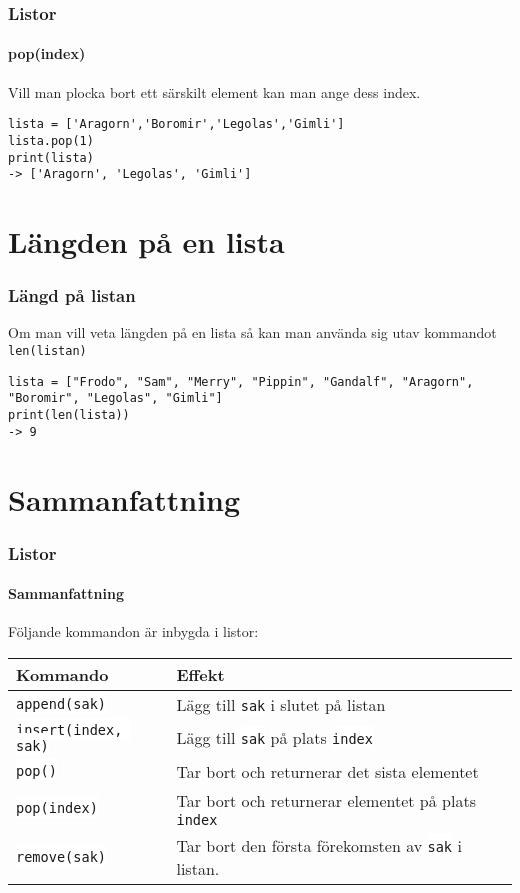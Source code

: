\documentclass[aspectratio=169]{beamer}
\newcommand{\code}[1]{\colorbox{white}{\lstinline{#1}}}
\begin{document}
\begin{frame}[fragile]
\frametitle{Listor}
\framesubtitle{pop(index)}

Vill man plocka bort ett särskilt element kan man ange dess index.

\begin{lstlisting}
lista = ['Aragorn','Boromir','Legolas','Gimli']
lista.pop(1)
print(lista)
-> ['Aragorn', 'Legolas', 'Gimli']
\end{lstlisting}
\end{frame}

\section{Längden på en lista}

\begin{frame}[fragile]
\frametitle{Längd på listan}

Om man vill veta längden på en lista så kan man använda sig utav kommandot \code{len(listan)}

\begin{lstlisting}
lista = ["Frodo", "Sam", "Merry", "Pippin", "Gandalf", "Aragorn", "Boromir", "Legolas", "Gimli"]
print(len(lista))
-> 9
\end{lstlisting}

\end{frame}

\section{Sammanfattning}

\begin{frame}[fragile]
\frametitle{Listor}
\framesubtitle{Sammanfattning}

Följande kommandon är inbygda i listor:

\begin{center}
\begin{tabular}{|lp{6cm}|}
\hline
	\textbf{Kommando} & \textbf{Effekt} \\ \hline
	\code{append(sak)}	& Lägg till \code{sak} i slutet på listan \\ 
	\code{insert(index, sak)} & Lägg till \code{sak} på plats \code{index} \\ 
	\code{pop()}			& Tar bort och returnerar det sista elementet\\ 
	\code{pop(index)}		& Tar bort och returnerar elementet på plats \code{index} \\
	\code{remove(sak)}	& Tar bort den första förekomsten av \code{sak} i listan. \\ \hline
\end{tabular}
\end{center}

\end{frame}
\end{document}
